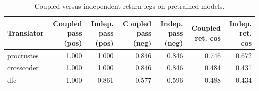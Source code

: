 \begin{table}[t]
\centering
\small
\begin{tabular}{lrrrrrr}
\toprule
Translator & Coupled pass (pos) & Indep. pass (pos) & Coupled pass (neg) & Indep. pass (neg) & Coupled ret. cos & Indep. ret. cos \\
\midrule
procrustes & 1.000 & 1.000 & 0.846 & 0.846 & 0.746 & 0.672 \\
crosscoder & 1.000 & 1.000 & 0.846 & 0.846 & 0.484 & 0.431 \\
dfc & 1.000 & 0.861 & 0.577 & 0.596 & 0.488 & 0.434 \\
\bottomrule
\end{tabular}
\caption{Coupled versus independent return legs on pretrained models.}
\label{tab:coupling_natural_tiny}
\end{table}
